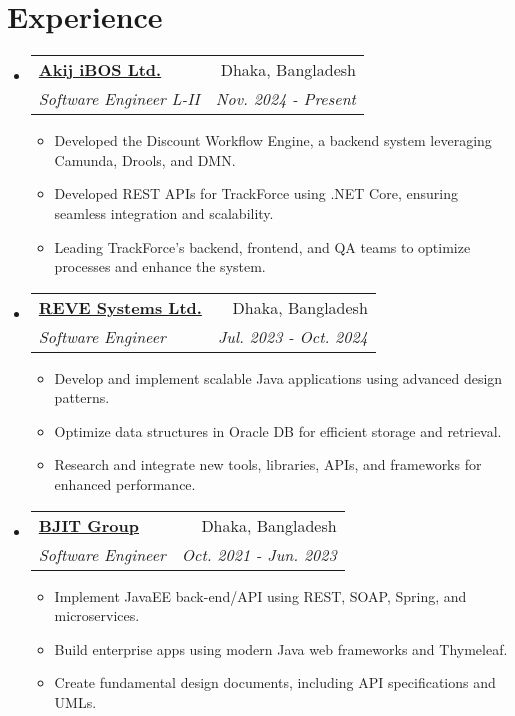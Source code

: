 \documentclass[a4paper,11pt]{article}
\makeatletter
\newcommand{\resumeItem}[1]{\item[$\bullet$] \small{#1 \vspace{-2pt}}}
\newcommand{\resumeSubHeadingListStart}{\begin{itemize}[leftmargin=0pt, label={}]}
\newcommand{\resumeSubHeadingListEnd}{\end{itemize}}
\newcommand{\resumeItemListStart}{\begin{itemize}}
\newcommand{\resumeItemListEnd}{\end{itemize}\vspace{-5pt}}
\newcommand{\resumeSubheading}[5]{
    \vspace{-1pt}\item
    \begin{tabular*}{1\textwidth}{l@{\extracolsep{\fill}}r}
    \textbf{\href{#4}{#1}} & #2 \\
    \textit{\small#3} & \textit{\small #5} \\
    \end{tabular*}\vspace{-5pt}
}
\makeatother
\begin{document}
    \section{Experience}
    \resumeSubHeadingListStart
    \resumeSubheading
    {Akij iBOS Ltd.}{Dhaka, Bangladesh}
    {Software Engineer L-II}{https://ibos.io/}{Nov. 2024 - Present}
    \resumeItemListStart
    \resumeItem{Developed the Discount Workflow Engine, a backend system leveraging Camunda, Drools, and DMN.}
    \resumeItem{Developed REST APIs for TrackForce using .NET Core, ensuring seamless integration and scalability.}
    \resumeItem{Leading TrackForce's backend, frontend, and QA teams to optimize processes and enhance the system.}
    \resumeItemListEnd
    \resumeSubheading
    {REVE Systems Ltd.}{Dhaka, Bangladesh}
    {Software Engineer}{https://www.revesoft.com/}{Jul. 2023 - Oct. 2024}
    \resumeItemListStart
    \resumeItem{Develop and implement scalable Java applications using advanced design patterns.}
    \resumeItem{Optimize data structures in Oracle DB for efficient storage and retrieval.}
    \resumeItem{Research and integrate new tools, libraries, APIs, and frameworks for enhanced performance.}
    \resumeItemListEnd
    \resumeSubheading
    {BJIT Group}{Dhaka, Bangladesh}
    {Software Engineer}{https://bjitgroup.com/}{Oct. 2021 - Jun. 2023}
    \resumeItemListStart
    \resumeItem{Implement JavaEE back-end/API using REST, SOAP, Spring, and microservices.}
    \resumeItem{Build enterprise apps using modern Java web frameworks and Thymeleaf.}
    \resumeItem{Create fundamental design documents, including API specifications and UMLs.}
    \resumeItemListEnd
    \resumeSubHeadingListEnd

\end{document}

